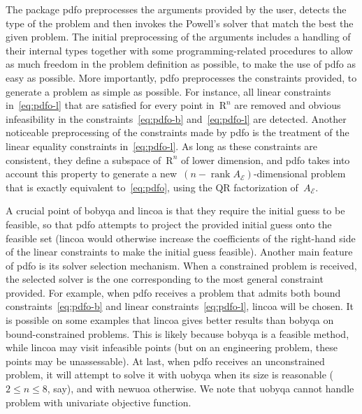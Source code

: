 \documentclass[11pt,draft]{article}
\numberwithin{equation}{section}
\DeclareMathOperator\rank{rank}
\def\R{\ensuremath{\mathds{R}}}
\def\aeq{\ensuremath{A_{\scriptscriptstyle\mathcal{E}}}}
\def\R{\mbox{R}}
\begin{document}
The package \gls{pdfo} preprocesses the arguments provided by the user, detects the type of the problem and then invokes the Powell's solver that match the best the given problem.
The initial preprocessing of the arguments includes a handling of their internal types together with some programming-related procedures to allow as much freedom in the problem definition as possible, to make
the use of \gls{pdfo} as easy as possible.
More importantly, \gls{pdfo} preprocesses the constraints provided, to generate a problem as simple as possible.
For instance, all linear constraints in~\eqref{eq:pdfo-l} that are satisfied for every point in~$\R^n$ are removed and obvious infeasibility in the constraints~\eqref{eq:pdfo-b} and~\eqref{eq:pdfo-l} are detected.
Another noticeable preprocessing of the constraints made by \gls{pdfo} is the treatment of the linear equality constraints in~\eqref{eq:pdfo-l}.
As long as these constraints are consistent, they define a subspace of~$\R^n$ of lower dimension, and \gls{pdfo} takes into account this property to generate a new~$(n - \rank \aeq)$-dimensional problem that is exactly equivalent to~\eqref{eq:pdfo}, using the QR factorization of~$\aeq$.

A crucial point of \gls{bobyqa} and \gls{lincoa} is that they require the initial guess to be feasible, so that \gls{pdfo} attempts to project the provided initial guess onto the feasible set (\gls{lincoa} would otherwise increase the coefficients of the right-hand side of the linear constraints to make the initial guess feasible).
Another main feature of \gls{pdfo} is its solver selection mechanism.
When a constrained problem is received, the selected solver is the one corresponding to the most general constraint provided.
For example, when \gls{pdfo} receives a problem that admits both bound constraints~\eqref{eq:pdfo-b} and linear constraints~\eqref{eq:pdfo-l}, \gls{lincoa} will be chosen.
It is possible on some examples that \gls{lincoa} gives better results than \gls{bobyqa} on bound-constrained problems.
This is likely because \gls{bobyqa} is a feasible method, while \gls{lincoa} may visit infeasible points (but on an engineering problem, these points may be unassessable).
At last, when \gls{pdfo} receives an unconstrained problem, it will attempt to solve it with \gls{uobyqa} when its size is reasonable ($2 \le n \le 8$, say), and with \gls{newuoa} otherwise.
We note that \gls{uobyqa} cannot handle problem with univariate objective function.
\end{document}
